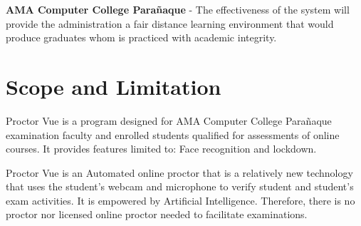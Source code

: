 \textbf{AMA Computer College Parañaque} - The effectiveness of the system will provide the administration a fair distance learning environment that would produce graduates whom is practiced with academic integrity.

\section{Scope and Limitation}

Proctor Vue is a program designed for AMA Computer College Parañaque examination faculty and enrolled students qualified for assessments of online courses.
It provides features limited to: Face recognition and lockdown.

Proctor Vue is an Automated online proctor that is a relatively new technology that uses the student’s webcam and microphone to verify student and student’s exam activities.
It is empowered by Artificial Intelligence.
Therefore, there is no proctor nor licensed online proctor needed to facilitate examinations.
